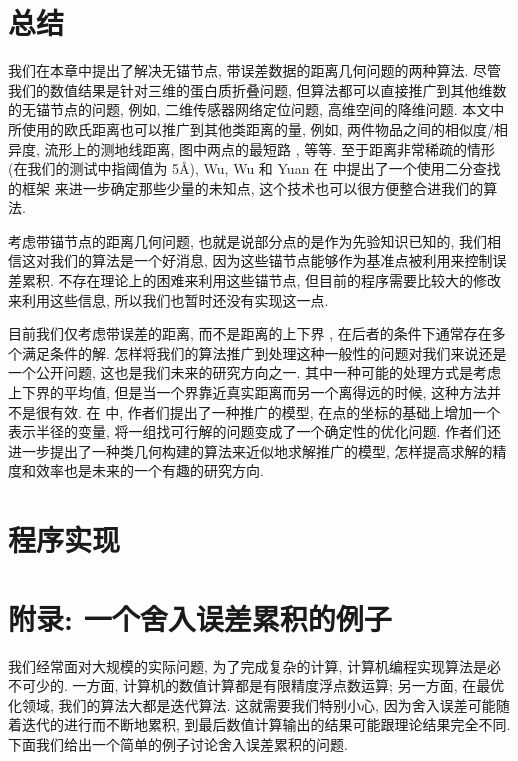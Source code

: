 \section{总结}
\label{sec:summary}
我们在本章中提出了解决无锚节点, 带误差数据的距离几何问题的两种算法.
尽管我们的数值结果是针对三维的蛋白质折叠问题, 
但算法都可以直接推广到其他维数的无锚节点的问题,
例如, 二维传感器网络定位问题, 高维空间的降维问题.
本文中所使用的欧氏距离也可以推广到其他类距离的量,
例如, 两件物品之间的相似度/相异度, 流形上的测地线距离,
图中两点的最短路 \cite{Isomap2000}, 等等. 
至于距离非常稀疏的情形 (在我们的测试中指阈值为 5\AA ), 
Wu, Wu 和 Yuan 在 \cite{Wu2008} 中提出了一个使用二分查找的框架
来进一步确定那些少量的未知点,
这个技术也可以很方便整合进我们的算法.

考虑带锚节点的距离几何问题, 也就是说部分点的是作为先验知识已知的,
我们相信这对我们的算法是一个好消息, 
因为这些锚节点能够作为基准点被利用来控制误差累积.
不存在理论上的困难来利用这些锚节点,
但目前的程序需要比较大的修改来利用这些信息,
所以我们也暂时还没有实现这一点.

目前我们仅考虑带误差的距离,
而不是距离的上下界 \cite{Biswas2008,Fang2013,Sit2011,Voller2013}, 
在后者的条件下通常存在多个满足条件的解.
怎样将我们的算法推广到处理这种一般性的问题对我们来说还是一个公开问题,
这也是我们未来的研究方向之一.
其中一种可能的处理方式是考虑上下界的平均值,
但是当一个界靠近真实距离而另一个离得远的时候, 这种方法并不是很有效.
在 \cite{Sit2011,Voller2013} 中, 作者们提出了一种推广的模型,
在点的坐标的基础上增加一个表示半径的变量,
将一组找可行解的问题变成了一个确定性的优化问题.
作者们还进一步提出了一种类几何构建的算法来近似地求解推广的模型,
怎样提高求解的精度和效率也是未来的一个有趣的研究方向. 



\section{程序实现}
\label{sec:CodeWrite}


\section{附录: 一个舍入误差累积的例子}
\label{sec:ErrExample}
我们经常面对大规模的实际问题, 为了完成复杂的计算, 
计算机编程实现算法是必不可少的.
一方面, 计算机的数值计算都是有限精度浮点数运算;
另一方面, 在最优化领域, 我们的算法大都是迭代算法.
这就需要我们特别小心, 因为舍入误差可能随着迭代的进行而不断地累积,
到最后数值计算输出的结果可能跟理论结果完全不同.
下面我们给出一个简单的例子讨论舍入误差累积的问题.

